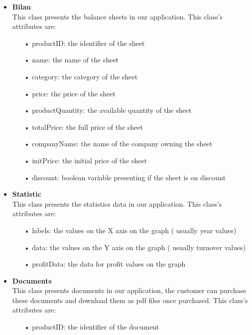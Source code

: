 \begin{itemize}
\begin{itemize}
\end{itemize}
\item \textbf{Bilan}\\
This class presents the balance sheets in our application. This class's attributes are:
\begin{itemize}
\item[•] productID: the identifier of the sheet

\item[•] name: the name of the sheet
\item[•] category: the category of the sheet
\item[•] price: the price of the sheet
\item[•] productQuantity: the available quantity of the sheet
\item[•] totalPrice: the full price of the sheet
\item[•] companyName: the name of the company owning the sheet
\item[•] initPrice: the initial price of the sheet
\item[•] discount: boolean variable presenting if the sheet is on discount
\end{itemize}
\item \textbf{Statistic}\\
This class presents the statistics data in our application. This class's attributes are:
\begin{itemize}
\item[•] labels: the values on the X axis on the graph ( usually year values) 

\item[•] data: the values on the Y axis on the graph ( usually turnover values) 
\item[•] profitData: the data for profit values on the graph


\end{itemize}

\item \textbf{Documents}\\
This class presents documents in our application, the customer can purchase these documents and download them as pdf files once purchased. This class's attributes are:
\begin{itemize}
\item[•] productID: the identifier of the document


\end{itemize}
\end{itemize}
